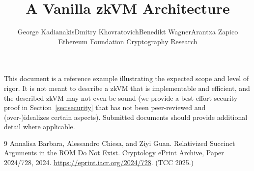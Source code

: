 \documentclass[11pt]{article}
\title{A Vanilla zkVM Architecture}
\author{George Kadianakis\quad Dmitry Khovratovich\quad Benedikt Wagner\quad Arantxa Zapico\\[8pt]
{\normalsize Ethereum Foundation Cryptography Research}}
\begin{document}
\maketitle

\begin{instruction}
This document is a reference example illustrating the expected scope and level of rigor. It is not meant to describe a zkVM that is implementable and efficient, and the described zkVM may not even be sound (we provide a best-effort security proof in Section~\ref{sec:security} that has not been peer-reviewed and (over-)idealizes certain aspects). Submitted documents should provide additional detail where applicable.
\end{instruction}








\begin{thebibliography}{9}
  Annalisa Barbara, Alessandro Chiesa, and Ziyi Guan.
  \newblock Relativized Succinct Arguments in the {ROM} Do Not Exist.
  \newblock Cryptology ePrint Archive, Paper 2024/728, 2024.
  \newblock \url{https://eprint.iacr.org/2024/728}. (TCC 2025.)
\end{thebibliography}
\end{document}
